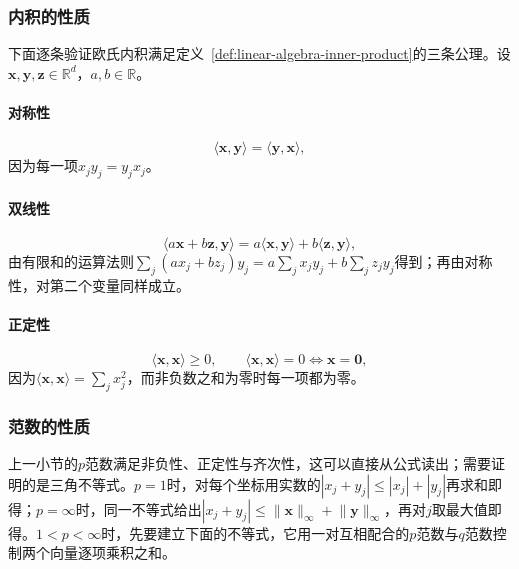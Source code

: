 \subsubsection{内积的性质}

下面逐条验证欧氏内积满足定义~\ref{def:linear-algebra-inner-product}的三条公理。设$\bm x,\bm y,\bm z\in\mathbb R^d$，$a,b\in\mathbb R$。

\paragraph{对称性}
\[
 \langle\bm x,\bm y\rangle=\langle\bm y,\bm x\rangle,
\]
因为每一项$x_jy_j=y_jx_j$。

\paragraph{双线性}
\[
 \langle a\bm x+b\bm z,\bm y\rangle=a\langle\bm x,\bm y\rangle+b\langle\bm z,\bm y\rangle,
\]
由有限和的运算法则$\sum_j(ax_j+bz_j)y_j=a\sum_jx_jy_j+b\sum_jz_jy_j$得到；再由对称性，对第二个变量同样成立。

\paragraph{正定性}
\[
 \langle\bm x,\bm x\rangle\geq0,\qquad
 \langle\bm x,\bm x\rangle=0\iff\bm x=\bm0,
\]
因为$\langle\bm x,\bm x\rangle=\sum_jx_j^2$，而非负数之和为零时每一项都为零。

\subsubsection{范数的性质}
\label{sec:ls-norms-distances}
\label{sec:linear-algebra-distance-relations}

上一小节的$p$范数满足非负性、正定性与齐次性，这可以直接从公式读出；需要证明的是三角不等式。$p=1$时，对每个坐标用实数的$|x_j+y_j|\leq|x_j|+|y_j|$再求和即得；$p=\infty$时，同一不等式给出$|x_j+y_j|\leq\lVert\bm x\rVert_\infty+\lVert\bm y\rVert_\infty$，再对$j$取最大值即得。$1<p<\infty$时，先要建立下面的不等式，它用一对互相配合的$p$范数与$q$范数控制两个向量逐项乘积之和。

